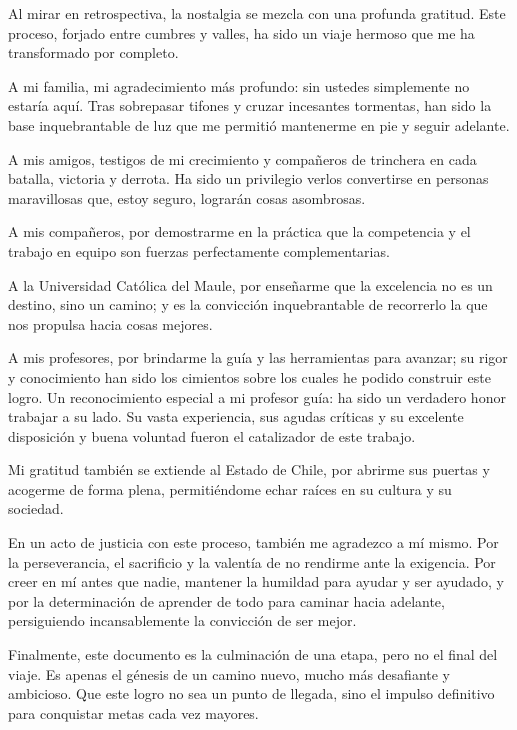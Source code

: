 Al mirar en retrospectiva, la nostalgia se mezcla con una profunda gratitud. Este proceso, forjado entre cumbres y valles, ha sido un viaje hermoso que me ha transformado por completo.

A mi familia, mi agradecimiento más profundo: sin ustedes simplemente no estaría aquí. Tras sobrepasar tifones y cruzar incesantes tormentas, han sido la base inquebrantable de luz que me permitió mantenerme en pie y seguir adelante.

A mis amigos, testigos de mi crecimiento y compañeros de trinchera en cada batalla, victoria y derrota. Ha sido un privilegio verlos convertirse en personas maravillosas que, estoy seguro, lograrán cosas asombrosas.

A mis compañeros, por demostrarme en la práctica que la competencia y el trabajo en equipo son fuerzas perfectamente complementarias.

A la Universidad Católica del Maule, por enseñarme que la excelencia no es un destino, sino un camino; y es la convicción inquebrantable de recorrerlo la que nos propulsa hacia cosas mejores.

A mis profesores, por brindarme la guía y las herramientas para avanzar; su rigor y conocimiento han sido los cimientos sobre los cuales he podido construir este logro. Un reconocimiento especial a mi profesor guía: ha sido un verdadero honor trabajar a su lado. Su vasta experiencia, sus agudas críticas y su excelente disposición y buena voluntad fueron el catalizador de este trabajo.

Mi gratitud también se extiende al Estado de Chile, por abrirme sus puertas y acogerme de forma plena, permitiéndome echar raíces en su cultura y su sociedad.

En un acto de justicia con este proceso, también me agradezco a mí mismo. Por la perseverancia, el sacrificio y la valentía de no rendirme ante la exigencia. Por creer en mí antes que nadie, mantener la humildad para ayudar y ser ayudado, y por la determinación de aprender de todo para caminar hacia adelante, persiguiendo incansablemente la convicción de ser mejor.

Finalmente, este documento es la culminación de una etapa, pero no el final del viaje. Es apenas el génesis de un camino nuevo, mucho más desafiante y ambicioso. Que este logro no sea un punto de llegada, sino el impulso definitivo para conquistar metas cada vez mayores.